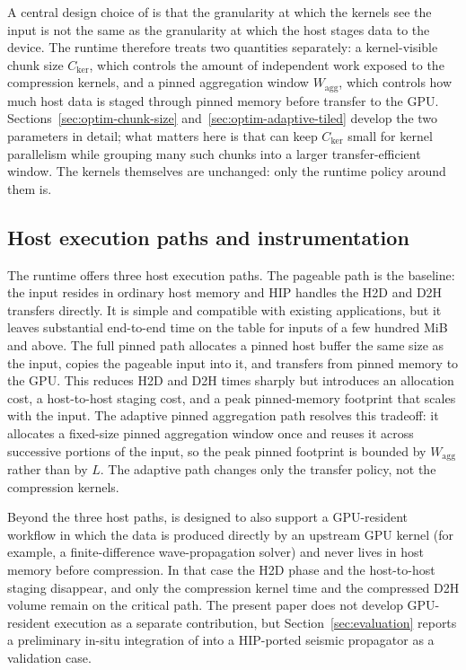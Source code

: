 A central design choice of \arcto{} is that the granularity at which
the kernels see the input is not the same as the granularity at which
the host stages data to the device. The runtime therefore treats two
quantities separately: a kernel-visible chunk size $C_{\text{ker}}$,
which controls the amount of independent work exposed to the
compression kernels, and a pinned aggregation window $W_{\text{agg}}$,
which controls how much host data is staged through pinned memory
before transfer to the GPU. Sections~\ref{sec:optim-chunk-size}
and~\ref{sec:optim-adaptive-tiled} develop the two parameters in
detail; what matters here is that \arcto{} can keep $C_{\text{ker}}$
small for kernel parallelism while grouping many such chunks into a
larger transfer-efficient window. The kernels themselves are
unchanged: only the runtime policy around them is.

\subsection{Host execution paths and instrumentation}
\label{sec:arcto-host-paths}

The runtime offers three host execution paths. The pageable path is
the baseline: the input resides in ordinary host memory and HIP
handles the H2D and D2H transfers directly. It is simple and
compatible with existing applications, but it leaves substantial
end-to-end time on the table for inputs of a few hundred MiB and
above. The full pinned path allocates a pinned host buffer the same
size as the input, copies the pageable input into it, and transfers
from pinned memory to the GPU. This reduces H2D and D2H times sharply
but introduces an allocation cost, a host-to-host staging cost, and a
peak pinned-memory footprint that scales with the input. The adaptive
pinned aggregation path resolves this tradeoff: it allocates a
fixed-size pinned aggregation window once and reuses it across
successive portions of the input, so the peak pinned footprint is
bounded by $W_{\text{agg}}$ rather than by $L$. The adaptive path
changes only the transfer policy, not the compression kernels.

Beyond the three host paths, \arcto{} is designed to also support a
GPU-resident workflow in which the data is produced directly by an
upstream GPU kernel (for example, a finite-difference wave-propagation
solver) and never lives in host memory before compression. In that
case the H2D phase and the host-to-host staging disappear, and only
the compression kernel time and the compressed D2H volume remain on
the critical path. The present paper does not develop GPU-resident
execution as a separate contribution, but
Section~\ref{sec:evaluation} reports a preliminary in-situ
integration of \arcto{} into a HIP-ported seismic propagator as a
validation case.


